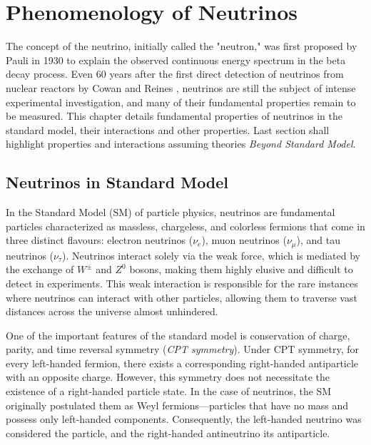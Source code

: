 \setchapterpreamble[u]{\margintoc}
\chapter{Phenomenology of Neutrinos}

The concept of the neutrino, initially called the "neutron," was first proposed by Pauli in 1930  to explain the observed continuous energy spectrum in the beta decay process. Even 60 years after the first direct detection of neutrinos from nuclear reactors by Cowan and Reines , neutrinos are still the subject of intense experimental investigation, and many of their fundamental properties remain to be measured. This chapter details fundamental properties of neutrinos in the standard model, their interactions and other properties. Last section shall highlight properties and interactions assuming theories \emph{Beyond Standard Model}.

\section{Neutrinos in Standard Model}
\label{sec:sm_nu}
In the Standard Model (SM) of particle physics, neutrinos are fundamental particles characterized as massless, chargeless, and colorless fermions that come in three distinct flavours: electron neutrinos ($\nu_e$), muon neutrinos ($\nu_\mu$), and tau neutrinos ($\nu_\tau$). Neutrinos interact solely via the weak force, which is mediated by the exchange of $W^\pm$ and $Z^0$ bosons, making them highly elusive and difficult to detect in experiments. This weak interaction is responsible for the rare instances where neutrinos can interact with other particles, allowing them to traverse vast distances across the universe almost unhindered. 

One of the important features of the standard model is conservation of charge, parity, and time reversal symmetry (\emph{CPT symmetry}). Under CPT symmetry, for every left-handed fermion, there exists a corresponding right-handed antiparticle with an opposite charge. However, this symmetry does not necessitate the existence of a right-handed particle state. In the case of neutrinos, the SM originally postulated them as Weyl fermions—particles that have no mass and possess only left-handed components. Consequently, the left-handed neutrino was considered the particle, and the right-handed antineutrino its antiparticle. 


